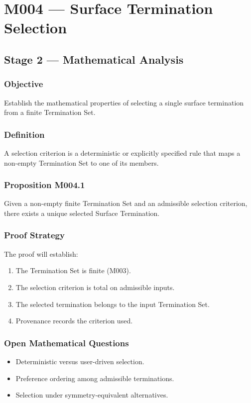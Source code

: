 \chapter{M004 --- Surface Termination Selection}

\section{Stage 2 --- Mathematical Analysis}

\subsection{Objective}

Establish the mathematical properties of selecting a single surface
termination from a finite Termination Set.

\subsection{Definition}

A selection criterion is a deterministic or explicitly specified rule
that maps a non-empty Termination Set to one of its members.

\subsection{Proposition M004.1}

Given a non-empty finite Termination Set and an admissible selection
criterion, there exists a unique selected Surface Termination.

\subsection{Proof Strategy}

The proof will establish:

\begin{enumerate}
\item The Termination Set is finite (M003).
\item The selection criterion is total on admissible inputs.
\item The selected termination belongs to the input Termination Set.
\item Provenance records the criterion used.
\end{enumerate}

\subsection{Open Mathematical Questions}

\begin{itemize}
\item Deterministic versus user-driven selection.
\item Preference ordering among admissible terminations.
\item Selection under symmetry-equivalent alternatives.
\end{itemize}
